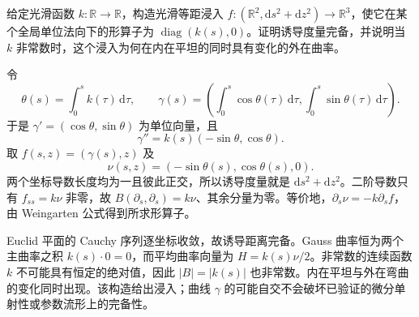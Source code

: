 \begin{exercise}\label{g3:ex:prescribed-cylinder-bending}
	给定光滑函数 \(k:\mathbb R\to\mathbb R\)，构造光滑等距浸入 \(f:(\mathbb R^2,\mathrm ds^2+\mathrm dz^2)\to\mathbb R^3\)，使它在某个全局单位法向下的形算子为 \(\operatorname{diag}(k(s),0)\)。证明诱导度量完备，并说明当 \(k\) 非常数时，这个浸入为何在内在平坦的同时具有变化的外在曲率。
\end{exercise}
\begin{solution}
	令
	\[
		\theta(s)=\int_0^s k(\tau)\,\mathrm d\tau,\qquad
		\gamma(s)=\left(\int_0^s\cos\theta(\tau)\,\mathrm d\tau,
		\int_0^s\sin\theta(\tau)\,\mathrm d\tau\right).
	\]
	于是 \(\gamma'=(\cos\theta,\sin\theta)\) 为单位向量，且
	\[
		\gamma''=k(s)(-\sin\theta,\cos\theta).
	\]
	取 \(f(s,z)=(\gamma(s),z)\) 及
	\[
		\nu(s,z)=(-\sin\theta(s),\cos\theta(s),0).
	\]
	两个坐标导数长度均为一且彼此正交，所以诱导度量就是 \(\mathrm ds^2+\mathrm dz^2\)。二阶导数只有 \(f_{ss}=k\nu\) 非零，故 \(B(\partial_s,\partial_s)=k\nu\)、其余分量为零。等价地，\(\partial_s\nu=-k\partial_sf\)，由 Weingarten 公式得到所求形算子。

	Euclid 平面的 Cauchy 序列逐坐标收敛，故诱导距离完备。Gauss 曲率恒为两个主曲率之积 \(k(s)\cdot0=0\)，而平均曲率向量为 \(H=k(s)\nu/2\)。非常数的连续函数 \(k\) 不可能具有恒定的绝对值，因此 \(|B|=|k(s)|\) 也非常数。内在平坦与外在弯曲的变化同时出现。该构造给出浸入；曲线 \(\gamma\) 的可能自交不会破坏已验证的微分单射性或参数流形上的完备性。
\end{solution}

